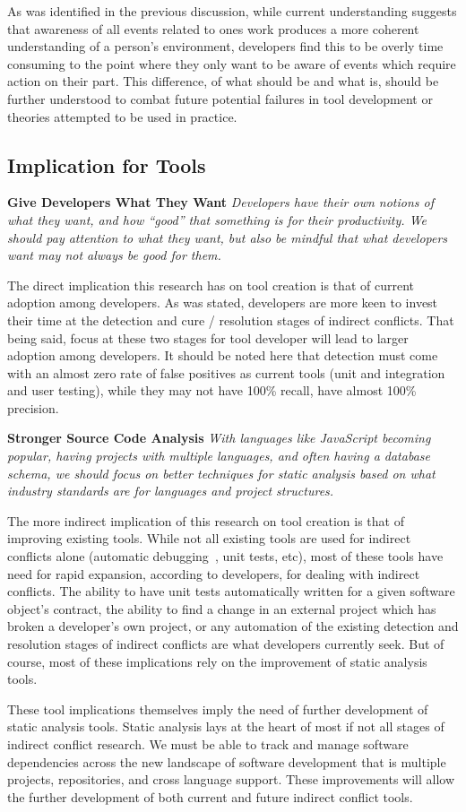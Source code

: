 As was identified in the previous discussion, while current understanding suggests that awareness of all events related to ones work
produces a more coherent understanding of a person's environment, developers find this to be overly time consuming
to the point where they only want to be aware of events which require action on their part. This difference, of what 
should be and what is, should be further understood to combat future potential failures in
tool development or theories attempted to be used in practice.

\subsection{Implication for Tools}
\label{sec:implt}

\textbf{Give Developers What They Want} \textit{Developers have their own notions of what they want, and how ``good''
that something is for their productivity. We should pay attention to what they want, but also be mindful that what
developers want may not always be good for them.}

The direct implication this research has on tool creation is that of current adoption among developers. As was stated,
developers are more keen to invest their time at the detection and cure / resolution stages of indirect conflicts. That being 
said, focus at these two stages for tool developer will lead to larger adoption among developers.
It should be noted here that detection must come with an almost zero rate of false positives as
current tools (unit and integration and user testing), while they may not have 100\% recall, have almost 100\% precision.

\textbf{Stronger Source Code Analysis} \textit{With languages like JavaScript becoming popular, having projects with
multiple languages, and often having a database schema, we should focus on better techniques for static analysis based
on what industry standards are for languages and project structures.}

The more indirect implication of this research on tool creation is that of improving existing tools. While not all existing
tools are used for indirect conflicts alone (automatic debugging~\cite{Zeller:2005:WPF}, unit tests, etc), most of these tools
have need for rapid expansion, according to developers, for dealing with indirect conflicts. The ability to have unit tests
automatically written for a given software object's contract, the ability to find a change  in an external project
which has broken a developer's own project, or any automation of the existing detection and resolution stages of indirect
conflicts are what developers currently seek. But of course, most of these implications rely on the improvement of 
static analysis tools.

These tool implications themselves imply the need of further development of static analysis tools. Static 
analysis lays at the heart of most if not all stages of indirect conflict research. We must be able to track and manage
software dependencies across the new landscape of software development that is multiple projects, repositories, and cross
language support. These improvements will allow the further development of both current and future indirect conflict
tools.


